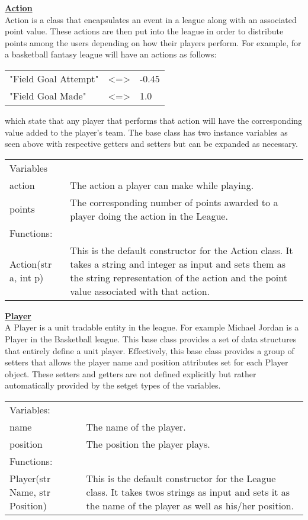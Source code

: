 \documentclass[12pt]{report}
\begin{document}
\begin{doublespace}
\textbf{\underline{Action}}
\\
Action is a class that encapsulates an event in a league along with an associated point value. These actions are then put into the league in order to distribute points among the users depending on how their players perform. For example, for a basketball fantasy league will have an actions as follows:
\begin{center}
\begin{tabular}{ l c l }
"Field Goal Attempt" & <=> & -0.45 \\
"Field Goal Made" & <=> & 1.0
\end{tabular}
\end{center}

which state that any player that performs that action will have the corresponding value added to the player's team. The base class has two instance variables as seen above with respective getters and setters but can be expanded as necessary.

\begin{tabular}{ l p{11cm} }
Variables & \\
action & The action a player can make while playing. \\
points & The corresponding number of points awarded to a player doing the action in the League. \\
Functions: & \\
Action(str a, int p) & This is the default constructor for the Action class. It takes a string and integer as input and sets them as the string representation of the action and the point value associated with that action.
\end{tabular}

\textbf{\underline{Player}}
\\
A Player is a unit tradable entity in the league. For example Michael Jordan is a Player in the Basketball league. This base class provides a set of data structures that entirely define a unit player.  Effectively, this base class provides a group of setters that allows the player name and position attributes set for each Player object. These setters and getters are not defined explicitly but rather automatically provided by the setget types of the variables.

\begin{tabular}{ l p{11cm} }
Variables: & \\
name & The name of the player. \\
position & The position the player plays. \\
Functions: & \\
Player(str Name, str Position) & This is the default constructor for the League class. It takes twos strings as input and sets it as the name of the player as well as his/her position.
\end{tabular}


\end{doublespace}
\end{document}
